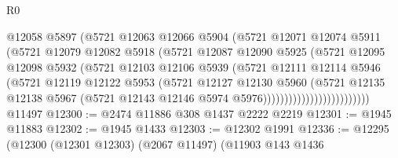 \begin{lexlean}{R0}
\begin{coremodule}
                                @12058
                                @5897
                                (@5721
                                  @12063
                                  @12066
                                  @5904
                                  (@5721
                                    @12071
                                    @12074
                                    @5911
                                    (@5721
                                      @12079
                                      @12082
                                      @5918
                                      (@5721
                                        @12087
                                        @12090
                                        @5925
                                        (@5721
                                          @12095
                                          @12098
                                          @5932
                                          (@5721
                                            @12103
                                            @12106
                                            @5939
                                            (@5721
                                              @12111
                                              @12114
                                              @5946
                                              (@5721
                                                @12119
                                                @12122
                                                @5953
                                                (@5721
                                                  @12127
                                                  @12130
                                                  @5960
                                                  (@5721
                                                    @12135
                                                    @12138
                                                    @5967
                                                    (@5721
                                                      @12143
                                                      @12146
                                                      @5974
                                                      @5976)))))))))))))))))))))))))
    @11497
@12300 := @2474 @11886 @308 @1437 @2222 @2219
@12301 := @1945 @11883
@12302 := @1945 @1433
@12303 := @12302 @1991
@12336 := @12295
    (@12300
      (@12301 @12303)
      (@2067 @11497)
      (@11903
        @143
        @1436

\end{coremodule}
\end{lexlean}
